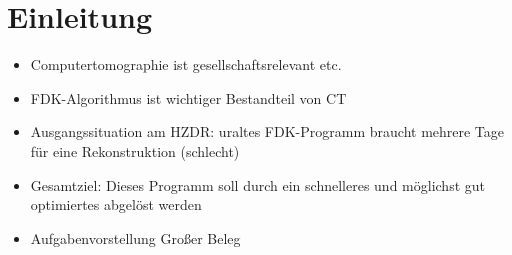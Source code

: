 \chapter{Einleitung}

\begin{itemize}
    \item Computertomographie ist gesellschaftsrelevant etc.
    \item FDK-Algorithmus ist wichtiger Bestandteil von CT
    \item Ausgangssituation am HZDR: uraltes FDK-Programm braucht mehrere Tage für eine Rekonstruktion (schlecht)
    \item Gesamtziel: Dieses Programm soll durch ein schnelleres und möglichst gut optimiertes abgelöst werden
    \item Aufgabenvorstellung Großer Beleg
\end{itemize}
